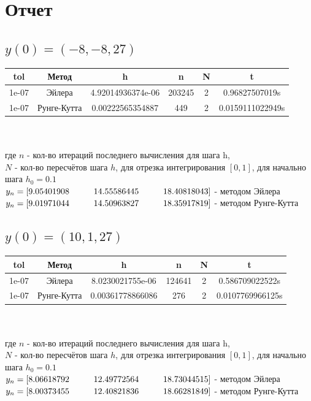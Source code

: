 \documentclass[oneside, final, 11pt]{article}
\newcommand\tab[1][1cm]{\hspace*{#1}}
\begin{document}
\section{Отчет}
\subsection{$y(0)=(-8, -8, 27)$}
\begin{tabular}{|c|c|c|c|c|c|}
\hline
tol     &   Метод       &   h   &   n   &   N   &   t   \\\hline
1e-07   &   Эйлера      &   4.92014936374e-06   &   203245   &   2   &   0.96827507019s   \\\hline
1e-07   &   Рунге-Кутта &   0.00222565354887   &   449   &   2   &   0.0159111022949s   \\\hline
\end{tabular} \\ \\
где $n$ - кол-во итераций последнего вычисления для шага h, \\
$N$ - кол-во пересчётов шага $h$, для отрезка интегрирования $[0, 1]$, для начально шага $h_0=0.1$ \\
$y_n = [9.05401908\tab14.55586445\tab18.40818043]$ - методом Эйлера \\
$y_n = [9.01971044\tab14.50963827\tab18.35917819]$ - методом Рунге-Кутта \\

\subsection{$y(0)=(10, 1, 27)$}
\begin{tabular}{|c|c|c|c|c|c|}
\hline
tol     &   Метод       &   h   &   n   &   N   &   t   \\\hline
1e-07   &   Эйлера      &   8.0230021755e-06   &   124641   &   2   &   0.586709022522s   \\\hline
1e-07   &   Рунге-Кутта &   0.00361778866086   &   276   &   2   &   0.0107769966125s   \\\hline
\end{tabular} \\ \\
где $n$ - кол-во итераций последнего вычисления для шага h, \\
$N$ - кол-во пересчётов шага $h$, для отрезка интегрирования $[0, 1]$, для начально шага $h_0=0.1$ \\
$y_n = [8.06618792\tab12.49772564\tab18.73044515]$ - методом Эйлера \\
$y_n = [8.00373455\tab12.40821836\tab18.66281849]$ - методом Рунге-Кутта \\
\end{document}
